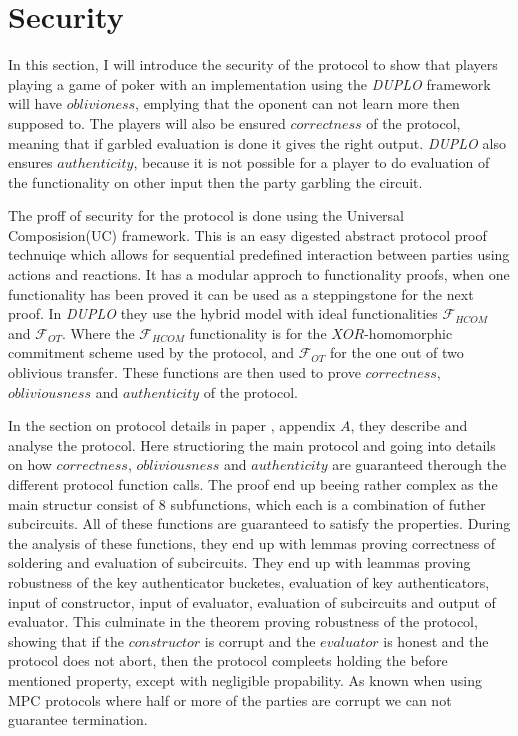 \documentclass[twoside,11pt,openright]{report}
\newcommand{\DUPLO}{\textit{DUPLO} }
\begin{document}
\section{Security}
\label{sec:duplo_secutity}
In this section, I will introduce the security of the protocol to show that players playing a game of poker with an implementation using the \DUPLO framework will have $oblivioness$, emplying that the oponent can not learn more then supposed to. The players will also be ensured $correctness$ of the protocol, meaning that if garbled evaluation is done it gives the right output. \DUPLO also ensures $authenticity$, because it is not possible for a player to do evaluation of the functionality on other input then the party garbling the circuit.

\bigskip

The proff of security for the protocol is done using the Universal Composision(UC) framework. This is an easy digested abstract protocol proof technuiqe which allows for sequential predefined interaction between parties using actions and reactions. It has a modular approch to functionality proofs, when one functionality has been proved it can be used as a steppingstone for the next proof. In \DUPLO they use the hybrid model with ideal functionalities $\mathcal{F}_{HCOM}$ and $\mathcal{F}_{OT}$. Where the $\mathcal{F}_{HCOM}$ functionality is for the $XOR$-homomorphic commitment scheme used by the protocol, and $\mathcal{F}_{OT}$ for the one out of two oblivious transfer. These functions are then used to prove $correctness$, $obliviousness$ and $authenticity$ of the protocol. 

In the section on protocol details in paper , appendix $A$, they describe and analyse the protocol. Here structioring the main protocol and going into details on how $correctness$, $obliviousness$ and $authenticity$ are guaranteed therough the different protocol function calls. The proof end up beeing rather complex as the main structur consist of $8$ subfunctions, which each is a combination of futher subcircuits. All of these functions are guaranteed to satisfy the properties. During the analysis of these functions, they end up with lemmas proving correctness of soldering and evaluation of subcircuits. They end up with leammas proving robustness of the key authenticator bucketes, evaluation of key authenticators, input of constructor, input of evaluator, evaluation of subcircuits and output of evaluator. This culminate in the theorem proving robustness of the protocol, showing that if the $constructor$ is corrupt and the $evaluator$ is honest and the protocol does not abort, then the protocol compleets holding the before mentioned property, except with negligible propability. As known when using MPC protocols where half or more of the parties are corrupt we can not guarantee termination.
\end{document}
